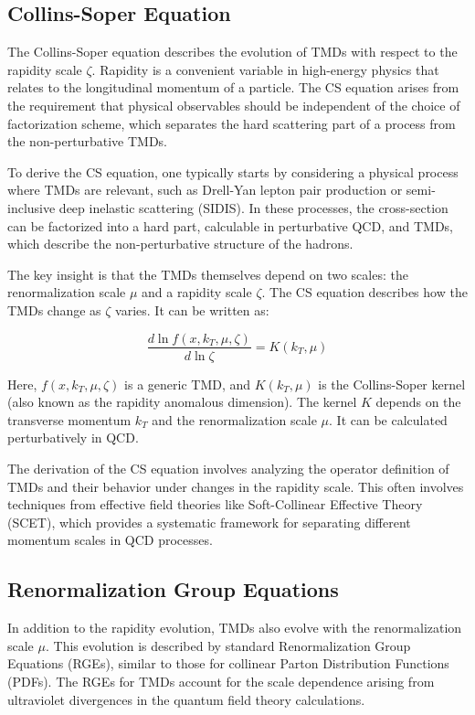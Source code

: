 \documentclass{article}
\begin{document}
\subsection{Collins-Soper Equation}

The Collins-Soper equation describes the evolution of TMDs with respect to the rapidity scale $\zeta$. Rapidity is a convenient variable in
high-energy physics that relates to the longitudinal momentum of a particle. The CS equation arises from the requirement that physical observables
should be independent of the choice of factorization scheme, which separates the hard scattering part of a process from the non-perturbative TMDs.

To derive the CS equation, one typically starts by considering a physical process where TMDs are relevant, such as Drell-Yan lepton pair production
or semi-inclusive deep inelastic scattering (SIDIS). In these processes, the cross-section can be factorized into a hard part, calculable in
perturbative QCD, and TMDs, which describe the non-perturbative structure of the hadrons.

The key insight is that the TMDs themselves depend on two scales: the renormalization scale $\mu$ and a rapidity scale $\zeta$. The CS equation
describes how the TMDs change as $\zeta$ varies. It can be written as:

\begin{equation}
  \frac{d \ln f(x, k_T, \mu, \zeta)}{d \ln \zeta} = K(k_T, \mu)
  \label{eq:CS}
\end{equation}

Here, $f(x, k_T, \mu, \zeta)$ is a generic TMD, and $K(k_T, \mu)$ is the Collins-Soper kernel (also known as the rapidity anomalous dimension). The
kernel $K$ depends on the transverse momentum $k_T$ and the renormalization scale $\mu$. It can be calculated perturbatively in QCD.\@

The derivation of the CS equation involves analyzing the operator definition of TMDs and their behavior under changes in the rapidity scale. This
often involves techniques from effective field theories like Soft-Collinear Effective Theory (SCET), which provides a systematic framework for
separating different momentum scales in QCD processes.

\subsection{Renormalization Group Equations}

In addition to the rapidity evolution, TMDs also evolve with the renormalization scale $\mu$. This evolution is described by standard Renormalization
Group Equations (RGEs), similar to those for collinear Parton Distribution Functions (PDFs). The RGEs for TMDs account for the scale dependence
arising from ultraviolet divergences in the quantum field theory calculations.
\end{document}

